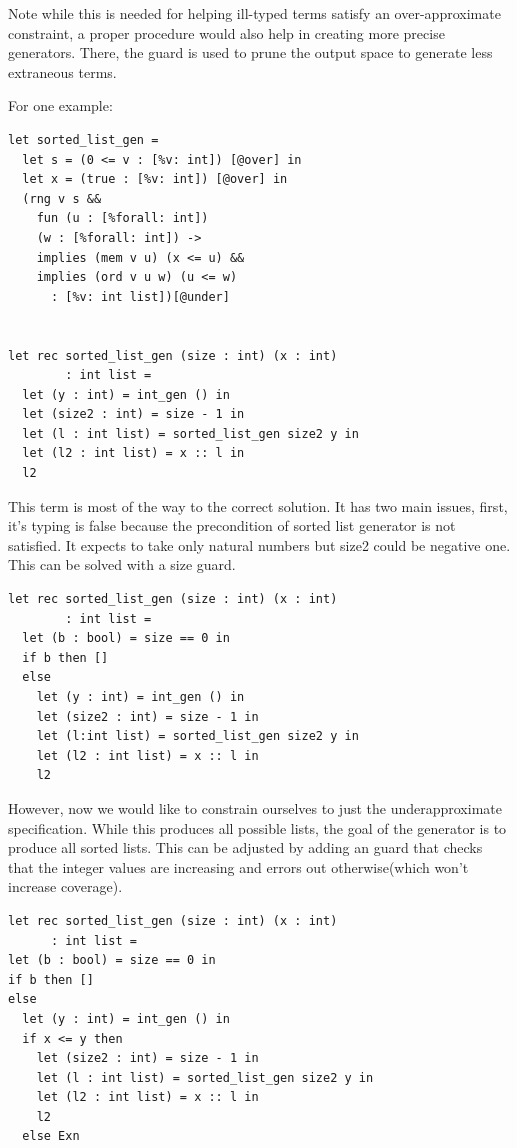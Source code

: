 \documentclass[review, sigplan]{acmart}
\begin{document}
Note while this is needed for helping ill-typed terms satisfy an
over-approximate constraint, a proper procedure would also help in creating more
precise generators. There, the guard is used to prune the output space to
generate less extraneous terms.

For one example:

\begin{lstlisting}[language=caml, basicstyle=\small\ttfamily]
let sorted_list_gen =
  let s = (0 <= v : [%v: int]) [@over] in
  let x = (true : [%v: int]) [@over] in
  (rng v s &&
    fun (u : [%forall: int])
    (w : [%forall: int]) ->
    implies (mem v u) (x <= u) &&
    implies (ord v u w) (u <= w)
      : [%v: int list])[@under]


let rec sorted_list_gen (size : int) (x : int)
        : int list =
  let (y : int) = int_gen () in
  let (size2 : int) = size - 1 in
  let (l : int list) = sorted_list_gen size2 y in
  let (l2 : int list) = x :: l in
  l2

\end{lstlisting}

This term is most of the way to the correct solution. It has two main issues,
first, it's typing is false because the precondition of sorted list generator is
not satisfied. It expects to take only natural numbers but size2 could be
negative one. This can be solved with a size guard.

\begin{lstlisting}[language=caml, basicstyle=\small\ttfamily]
let rec sorted_list_gen (size : int) (x : int)
        : int list =
  let (b : bool) = size == 0 in
  if b then []
  else
    let (y : int) = int_gen () in
    let (size2 : int) = size - 1 in
    let (l:int list) = sorted_list_gen size2 y in
    let (l2 : int list) = x :: l in
    l2
\end{lstlisting}

However, now we would like to constrain ourselves to just the underapproximate specification. While this
produces all possible lists, the goal of the generator is to produce all sorted
lists. This can be adjusted by adding an guard that checks that the
integer values are increasing and errors out otherwise(which won't increase coverage).

\begin{lstlisting}[language=caml, basicstyle=\small\ttfamily]
let rec sorted_list_gen (size : int) (x : int)
      : int list =
let (b : bool) = size == 0 in
if b then []
else
  let (y : int) = int_gen () in
  if x <= y then
    let (size2 : int) = size - 1 in
    let (l : int list) = sorted_list_gen size2 y in
    let (l2 : int list) = x :: l in
    l2
  else Exn
\end{lstlisting}
\end{document}
